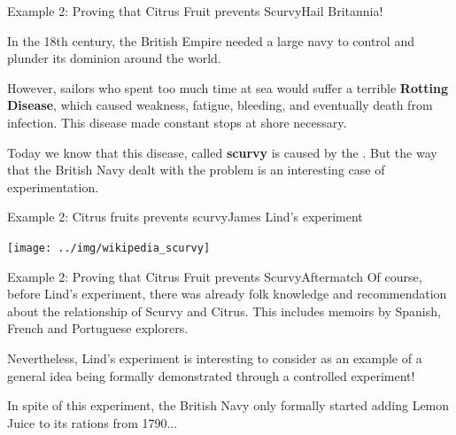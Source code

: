
\begin{frame}{Example 2: Proving that Citrus Fruit prevents Scurvy}{Hail Britannia!}
  
  In the 18th century, the British Empire needed a large navy to control and plunder its dominion around the world.\bigskip

  However, sailors who spent too much time at sea would suffer a terrible {\bf Rotting Disease}, which caused weakness, fatigue, bleeding, and eventually death from infection. This disease made constant stops at shore necessary.\bigskip

  Today we know that this disease, called {\bf scurvy} is caused by the . But the way that the British Navy dealt with the problem is an interesting case of experimentation.
\end{frame}

\begin{frame}{Example 2: Citrus fruits prevents scurvy}{James Lind's experiment}
  \begin{center}
    \texttt{[image: ../img/wikipedia\_scurvy]}
  \end{center}
\end{frame}

\begin{frame}{Example 2: Proving that Citrus Fruit prevents Scurvy}{Aftermatch}
  Of course, before Lind's experiment, there was already folk knowledge and recommendation about the relationship of Scurvy and Citrus. This includes memoirs by Spanish, French and Portuguese explorers.\bigskip

  Nevertheless, Lind's experiment is interesting to consider as an example of a general idea being formally demonstrated through a controlled experiment!\bigskip 

  In spite of this experiment, the British Navy only formally started adding Lemon Juice to its rations from 1790...
\end{frame}



